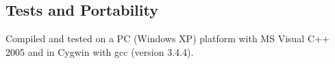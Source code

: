
\subsection{Tests and Portability}
Compiled and tested on a PC (Windows XP) platform with MS Visual C++ 2005 and
in Cygwin with gcc (version 3.4.4).

